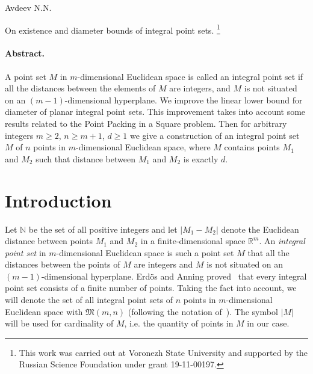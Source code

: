 \documentclass[a4paper,14pt]{article} %
\theoremstyle{plain}
\theoremstyle{definition}
\begin{document}
\renewcommand{\bibname}{Список цитированной литературы}
\renewcommand\refname{\bibname}

Avdeev N.N.

On existence and diameter bounds of integral point sets.
\footnote{
	This work was carried out at Voronezh State University and supported by the Russian Science
	Foundation under grant 19-11-00197.
}

\paragraph{Abstract.}
A point set $M$ in $m$-dimensional Euclidean space is called an integral point set if all the distances between the
elements of $M$ are integers, and $M$ is not situated on an $(m-1)$-dimensional hyperplane.
We improve the linear lower bound for diameter of planar integral point sets.
This improvement takes into account some results related to the Point Packing in a Square problem.
Then for arbitrary integers $m \geq 2$, $n \geq m+1$, $d \geq 1$
we give a construction of an integral point set $M$ of $n$ points in $m$-dimensional Euclidean space,
where $M$ contains points $M_1$ and $M_2$ such that distance between $M_1$ and $M_2$ is exactly $d$.



\section{Introduction}
Let $\mathbb{N}$ be the set of all positive integers and let $|M_1 - M_2|$ denote the Euclidean distance
between points $M_1$ and $M_2$ in a finite-dimensional space $\mathbb{R}^m$.
An \textit{integral point set} in $m$-dimensional Euclidean space is such a point set $M$ that all the distances between the
points of $M$ are integers and $M$ is not situated on an $(m-1)$-dimensional hyperplane.
Erd\"os and Anning proved~\cite{anning1945integral,erdos1945integral} that every integral point set consists of a finite number of points.
Taking the fact into account, we will denote the set of all integral point sets of $n$ points in $m$-dimensional Euclidean space with
$\mathfrak{M}(m,n)$ (following the notation of~\cite{our-vmmsh-2018}).
The symbol $|M|$ will be used for cardinality of $M$, i.e. the quantity of points in $M$ in our case.
\end{document}
